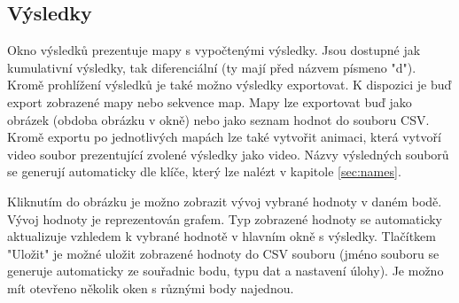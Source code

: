 \documentclass[a4paper,12pt]{article}
\begin{document}
\subsection{Výsledky}
\begin{figure}[H]
\end{figure}
Okno výsledků prezentuje mapy s vypočtenými výsledky. Jsou dostupné jak kumulativní výsledky, tak diferenciální (ty mají před názvem písmeno "d"). Kromě prohlížení výsledků je také možno výsledky exportovat. K dispozici je buď export zobrazené mapy nebo sekvence map. Mapy lze exportovat buď jako obrázek (obdoba obrázku v okně) nebo jako seznam hodnot do souboru CSV. Kromě exportu po jednotlivých mapách lze také vytvořit animaci, která vytvoří video soubor prezentující zvolené výsledky jako video. Názvy výsledných souborů se generují automaticky dle klíče, který lze nalézt v kapitole \ref{sec:names}.
\begin{figure}[H]
\end{figure}
Kliknutím do obrázku je možno zobrazit vývoj vybrané hodnoty v daném bodě. Vývoj hodnoty je reprezentován grafem. Typ zobrazené hodnoty se automaticky aktualizuje vzhledem k vybrané hodnotě v hlavním okně s výsledky. Tlačítkem "Uložit" je možné uložit zobrazené hodnoty do CSV souboru (jméno souboru se generuje automaticky ze souřadnic bodu, typu dat a nastavení úlohy). Je možno mít otevřeno několik oken s různými body najednou.
\newpage
\end{document}

